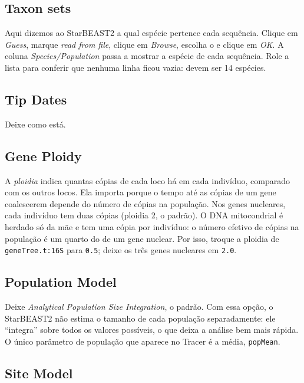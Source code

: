 \documentclass[11pt,a4paper]{article}
\newcommand{\arq}[1]{\path{#1}}
\newcommand{\ui}[1]{\textit{#1}}
\begin{document}
\subsection{Taxon sets}

Aqui dizemos ao StarBEAST2 a qual espécie pertence cada sequência. Clique em \ui{Guess}, marque
\ui{read from file}, clique em \ui{Browse}, escolha o \arq{especies.dat} e clique em \ui{OK}. A
coluna \ui{Species/Population} passa a mostrar a espécie de cada sequência. Role a lista para
conferir que nenhuma linha ficou vazia: devem ser 14 espécies.

\subsection{Tip Dates}

Deixe como está.

\subsection{Gene Ploidy}

A \emph{ploidia} indica quantas cópias de cada loco há em cada indivíduo, comparado com os
outros locos. Ela importa porque o tempo até as cópias de um gene coalescerem depende do número
de cópias na população. Nos genes nucleares, cada indivíduo tem duas cópias (ploidia 2, o
padrão). O DNA mitocondrial é herdado só da mãe e tem uma cópia por indivíduo: o número efetivo
de cópias na população é um quarto do de um gene nuclear. Por isso, troque a ploidia de
\verb|geneTree.t:16S| para \verb|0.5|; deixe os três genes nucleares em \verb|2.0|.

\subsection{Population Model}

Deixe \ui{Analytical Population Size Integration}, o padrão. Com essa opção, o StarBEAST2 não
estima o tamanho de cada população separadamente: ele ``integra'' sobre todos os valores
possíveis, o que deixa a análise bem mais rápida. O único parâmetro de população que aparece no
Tracer é a média, \verb|popMean|.

\subsection{Site Model}\label{sec:sitemodel}
\end{document}
